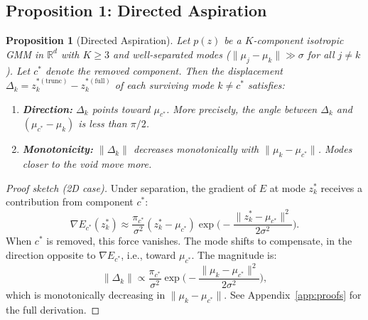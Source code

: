 \documentclass[11pt]{article}
\newtheorem{proposition}{Proposition}
\begin{document}
\subsection{Proposition 1: Directed Aspiration}
\label{sec:prop1}

\begin{proposition}[Directed Aspiration]
\label{prop:aspiration}
Let $p(z)$ be a $K$-component isotropic GMM in $\mathbb{R}^d$ with
$K \geq 3$ and well-separated modes ($\|\mu_j - \mu_k\| \gg \sigma$
for all $j \neq k$).
Let $c^*$ denote the removed component.
Then the displacement $\Delta_k = z_k^{*(\text{trunc})} - z_k^{*(\text{full})}$
of each surviving mode $k \neq c^*$ satisfies:
\begin{enumerate}
\item[(i)] \textbf{Direction:} $\Delta_k$ points toward $\mu_{c^*}$.
More precisely, the angle between $\Delta_k$ and $(\mu_{c^*} - \mu_k)$
is less than $\pi/2$.
\item[(ii)] \textbf{Monotonicity:} $\|\Delta_k\|$ decreases monotonically
with $\|\mu_k - \mu_{c^*}\|$. Modes closer to the void move more.
\end{enumerate}
\end{proposition}

\begin{proof}[Proof sketch (2D case)]
Under separation, the gradient of $E$ at mode $z_k^*$ receives a
contribution from component $c^*$:
\begin{equation}
\nabla E_{c^*}(z_k^*) \approx
  \frac{\pi_{c^*}}{\sigma^2}(z_k^* - \mu_{c^*})
  \exp\!\Big(-\frac{\|z_k^* - \mu_{c^*}\|^2}{2\sigma^2}\Big).
\end{equation}
When $c^*$ is removed, this force vanishes.
The mode shifts to compensate, in the direction opposite to
$\nabla E_{c^*}$, i.e., toward $\mu_{c^*}$.
The magnitude is:
\begin{equation}
\|\Delta_k\| \propto
  \frac{\pi_{c^*}}{\sigma^2}
  \exp\!\Big(-\frac{\|\mu_k - \mu_{c^*}\|^2}{2\sigma^2}\Big),
\end{equation}
which is monotonically decreasing in $\|\mu_k - \mu_{c^*}\|$.
See Appendix~\ref{app:proofs} for the full derivation.
\end{proof}
\end{document}
